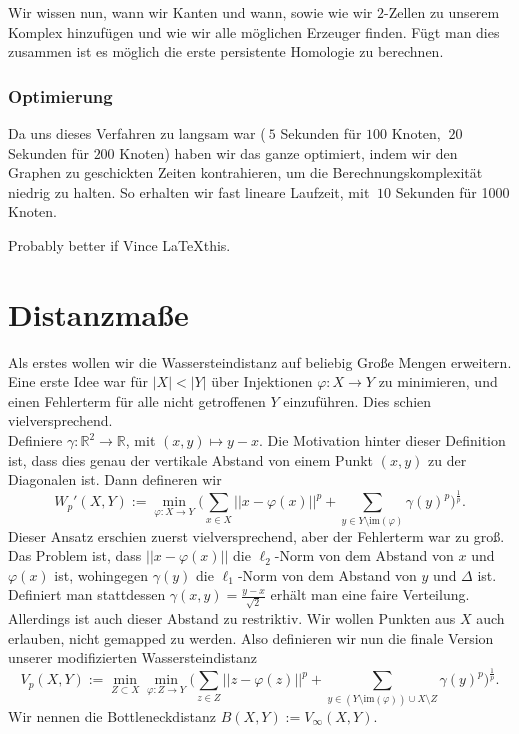 \documentclass[11pt, a4paper,draft]{report}
\newcommand{\bR}{\mathbb{R}}
\newcommand{\im}{\textrm{im}}
\begin{document}
 	Wir wissen nun, wann wir Kanten und wann, sowie wie wir $2$-Zellen zu unserem Komplex hinzufügen und wie wir alle möglichen Erzeuger finden. Fügt man dies zusammen ist es möglich die erste persistente Homologie zu berechnen.
 	
 	\subsection{Optimierung}
 	
 	Da uns dieses Verfahren zu langsam war ($~5$ Sekunden für $100$ Knoten, $~20$ Sekunden für $200$ Knoten) haben wir das ganze optimiert, indem wir den Graphen zu geschickten Zeiten kontrahieren, um die Berechnungskomplexität niedrig zu halten. So erhalten wir fast lineare Laufzeit, mit $~10$ Sekunden für 1000 Knoten.
 	
 	Probably better if Vince \LaTeX this.
 	
 	\chapter{Distanzmaße}
 	
 	Als erstes wollen wir die Wassersteindistanz auf beliebig Große Mengen erweitern. Eine erste Idee war für $|X|<|Y|$ über Injektionen $\varphi:X\rightarrow Y$ zu minimieren, und einen Fehlerterm für alle nicht getroffenen $Y$ einzuführen. Dies schien vielversprechend.\\
 	Definiere $\gamma:\bR^2\rightarrow\bR$, mit $(x,y)\mapsto y-x$. Die Motivation hinter dieser Definition ist, dass dies genau der vertikale Abstand von einem Punkt $(x,y)$ zu der Diagonalen ist. Dann defineren wir $$W_p'(X,Y):=\min_{\varphi:X\rightarrow Y}\bigg(\sum_{x\in X}||x-\varphi(x)||^p + \sum_{y\in Y\setminus \im(\varphi)}\gamma(y)^p\bigg)^\frac{1}{p}.$$
 	Dieser Ansatz erschien zuerst vielversprechend, aber der Fehlerterm war zu groß. Das Problem ist, dass $||x-\varphi(x)||$ die $\ell_2$-Norm von dem Abstand von $x$ und $\varphi(x)$ ist, wohingegen $\gamma(y)$ die $\ell_1$-Norm von dem Abstand von $y$ und $\Delta$ ist. Definiert man stattdessen $\gamma(x,y)=\frac{y-x}{\sqrt{2}}$ erhält man eine faire Verteilung. Allerdings ist auch dieser Abstand zu restriktiv. Wir wollen Punkten aus $X$ auch erlauben, nicht gemapped zu werden. Also definieren wir nun die finale Version unserer modifizierten Wassersteindistanz
 	$$V_p(X,Y):=\min_{Z\subset{X}}\min_{\varphi:Z\rightarrow Y}\bigg(\sum_{z\in Z}||z-\varphi(z)||^p + \sum_{y\in (Y\setminus \im(\varphi))\cup X\setminus Z}\gamma(y)^p\bigg)^\frac{1}{p}.$$
 	Wir nennen die Bottleneckdistanz $B(X,Y) := V_\infty(X,Y)$.
 	
\end{document}
